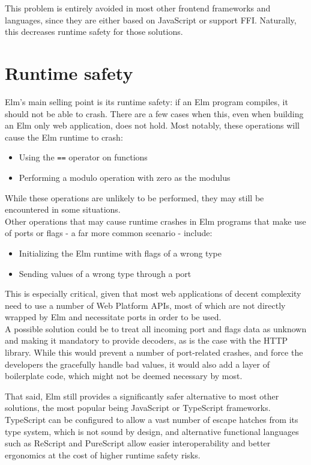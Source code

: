 This problem is entirely avoided in most other frontend frameworks and languages, since they are either based on JavaScript or support FFI. Naturally, this decreases runtime safety for those solutions.

\section{Runtime safety}
Elm's main selling point is its runtime safety: if an Elm program compiles, it should not be able to crash. There are a few cases when this, even when building an Elm only web application, does not hold. Most notably, these operations will cause the Elm runtime to crash:
\begin{itemize}
    \item Using the \texttt{==} operator on functions \cite{noauthor_corehints5md_nodate}
    \item Performing a modulo operation with zero as the modulus \cite{noauthor_corehints11md_nodate}
\end{itemize}
While these operations are unlikely to be performed, they may still be encountered in some situations.\\

Other operations that may cause runtime crashes in Elm programs that make use of ports or flags - a far more common scenario - include:
\begin{itemize}
    \item Initializing the Elm runtime with flags of a wrong type \cite{noauthor_corehints2md_nodate}
    \item Sending values of a wrong type through a port \cite{noauthor_corehints4md_nodate}
\end{itemize}
This is especially critical, given that most web applications of decent complexity need to use a number of Web Platform APIs, most of which are not directly wrapped by Elm and necessitate ports in order to be used.\\
A possible solution could be to treat all incoming port and flags data as unknown and making it mandatory to provide decoders, as is the case with the HTTP library. While this would prevent a number of port-related crashes, and force the developers the gracefully handle bad values, it would also add a layer of boilerplate code, which might not be deemed necessary by most.

That said, Elm still provides a significantly safer alternative to most other solutions, the most popular being JavaScript or TypeScript frameworks. TypeScript can be configured to allow a vast number of escape hatches from its type system, which is not sound by design, and alternative functional languages such as ReScript and PureScript allow easier interoperability and better ergonomics at the cost of higher runtime safety risks.

